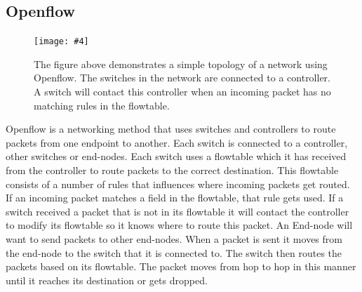 \documentclass{article}
\newcommand{\includefigure}[4]{
\begin{figure}[htb]
\centering
\texttt{[image: \#4]}
\captionsetup{width=.8\linewidth} 
\caption[#2]{#3}
\label{#1}
\end{figure}
}
\begin{document}
\subsection{Openflow}

\includefigure{OpenflowTopology}{A simple topology of an Openflow Network}{The figure above demonstrates a simple topology of a network using Openflow. The switches in the network are connected to a controller. A switch will contact this controller when an incoming packet has no matching rules in the flowtable.}{openflowtopology.PNG}

Openflow is a networking method that uses switches and controllers to route packets from one endpoint to another. Each switch is connected to a controller, other switches or end-nodes. Each switch uses a flowtable which it has received from the controller to route packets to the correct destination. This flowtable consists of a number of rules that influences where incoming packets get routed. If an incoming packet matches a field in the flowtable, that rule gets used. If a switch received a packet that is not in its flowtable it will contact the controller to modify its flowtable so it knows where to route this packet. An End-node will want to send packets to other end-nodes. When a packet is sent it moves from the end-node to the switch that it is connected to. The switch then routes the packets based on its flowtable. The packet moves from hop to hop in this manner until it reaches its destination or gets dropped.
\newline
\newline
\end{document}
